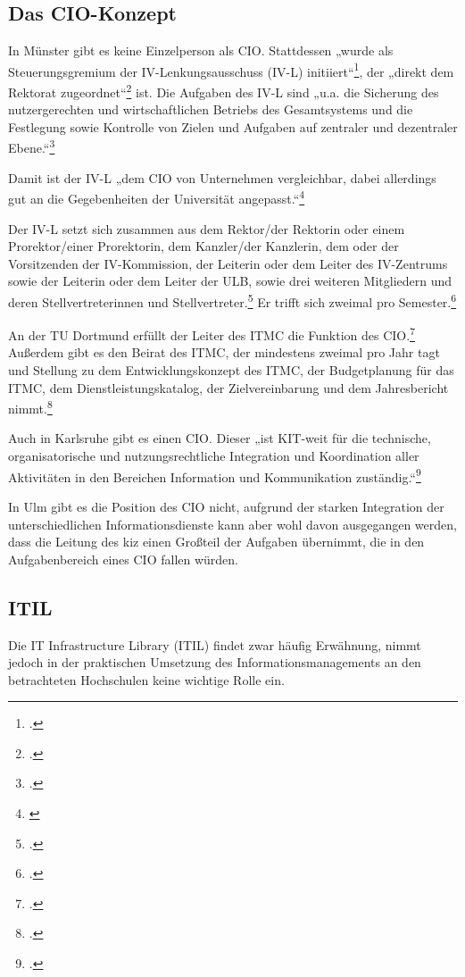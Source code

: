 \subsection{Das CIO-Konzept}
\label{subsection_cio_konzept}
In Münster gibt es keine Einzelperson als CIO. Stattdessen „wurde als Steuerungsgremium der IV-Lenkungsausschuss (IV-L) initiiert“\footcite[59]{bode_informationsmanagement_2010}, der „direkt dem Rektorat zugeordnet“\footcite[59]{bode_informationsmanagement_2010} ist. Die Aufgaben des IV-L sind „u.a. die Sicherung des nutzergerechten und wirtschaftlichen Betriebs des Gesamtsystems und die Festlegung sowie Kontrolle von Zielen und Aufgaben auf zentraler und dezentraler Ebene.“\footcite[9]{vogl_bericht_2013}

Damit ist der IV-L „dem CIO von Unternehmen vergleichbar, dabei allerdings gut an die Gegebenheiten der Universität angepasst.“\footnote{\cite[60]{bode_informationsmanagement_2010}}

Der IV-L setzt sich zusammen aus dem Rektor/der Rektorin oder einem Prorektor/einer Prorektorin, dem Kanzler/der Kanzlerin, dem oder der Vorsitzenden der IV-Kommission, der Leiterin oder dem Leiter des IV-Zentrums sowie der Leiterin oder dem Leiter der ULB, sowie drei weiteren Mitgliedern und deren Stellvertreterinnen und Stellvertreter.\footcite{wwu_ivlenkungsausschuss_2015}
Er trifft sich zweimal pro Semester.\footcite{wwu_ivlenkungsausschuss_2015}

An der TU Dortmund erfüllt der Leiter des ITMC die Funktion des CIO.\footcite[37]{tudortmund_jahrbuch_2009}
Außerdem gibt es den Beirat des ITMC, der mindestens zweimal pro Jahr tagt und Stellung zu dem Entwicklungskonzept des ITMC, der Budgetplanung für das ITMC, dem Dienstleistungskatalog, der Zielvereinbarung und dem Jahresbericht nimmt.\footcite{tudortmund_itmc_beirat_2013}

Auch in Karlsruhe gibt es einen CIO. Dieser „ist KIT-weit für die technische, organisatorische und nutzungsrechtliche Integration und Koordination aller Aktivitäten in den Bereichen Information und Kommunikation zuständig.“\footcite{kit_cio_2015}

In Ulm gibt  es die Position des CIO nicht, aufgrund der starken Integration der unterschiedlichen Informationsdienste kann aber wohl davon ausgegangen werden, dass die Leitung des kiz einen Großteil der Aufgaben übernimmt, die in den Aufgabenbereich eines CIO fallen würden.

\subsection{ITIL}
Die IT Infrastructure Library (ITIL) findet zwar häufig Erwähnung, nimmt jedoch in der praktischen Umsetzung des Informationsmanagements an den betrachteten Hochschulen keine wichtige Rolle ein.

